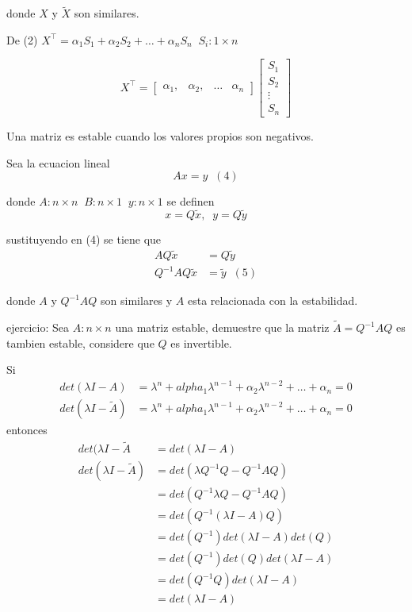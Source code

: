 donde \(X\) y \(\tilde{X}\) son similares.

De (2) \(X^\top = \alpha_{1}S_{1} + \alpha_{2}S_{2} + \ldots + \alpha_{n}S_{n}\;\; S_{i}:1\times n\)

\[
    X^\top = 
        \begin{bmatrix}
            \alpha_{1}, & \alpha_{2}, & \ldots & \alpha_{n}
        \end{bmatrix}
        \begin{bmatrix}
            S_{1}\\
            S_{2}\\
            \vdots\\
            S_{n}
        \end{bmatrix}
\]

Una matriz es estable cuando los valores propios son negativos.

Sea la ecuacion lineal 
\[
    Ax=y\;\;(4)
\]

donde \(A:n\times n\;\; B:n\times 1\;\; y:n\times 1\)
se definen
\[
    x=Q\tilde{x}, \;\; y=Q\tilde{y}
\]

sustituyendo en (4) se tiene que 
\[
    \begin{split}
        AQ\tilde{x} & = Q\tilde{y}\\
        Q^{-1}AQ\tilde{x} & =\tilde{y} \;\; (5)
    \end{split}
\]

donde \(A\) y \(Q^{-1}AQ\) son similares y \(A\) esta relacionada con la estabilidad.

ejercicio: Sea \(A:n\times n\) una matriz estable, demuestre que la matriz \(\tilde{A} = Q^{-1}AQ\) es tambien estable, considere que \(Q\) es invertible.

Si
\[
    \begin{split}
        det(\lambda I-A) & = \lambda^n + alpha_{1}\lambda^{n-1} + \alpha_{2}\lambda^{n-2} + \ldots + \alpha_{n} = 0\\
        det(\lambda I-\tilde{A}) & = \lambda^n + alpha_{1}\lambda^{n-1} + \alpha_{2}\lambda^{n-2} + \ldots + \alpha_{n} = 0
    \end{split}
\]
entonces
\[
    \begin{split}
        det(\lambda I-\tilde{A} & = det(\lambda I-A )\\
        det(\lambda I-\tilde{A}) & = det(\lambda Q^{-1}Q-Q^{-1}AQ)\\
        & = det(Q^{-1}\lambda Q-Q^{-1}AQ)\\
        & = det(Q^{-1}(\lambda I-A)Q)\\
        & = det(Q^{-1}) det(\lambda I-A) det(Q)\\
        & = det(Q^{-1}) det(Q) det(\lambda I-A)\\
        & = det(Q^{-1}Q) det(\lambda I-A)\\
        & = det(\lambda I-A)
    \end{split}
\]

